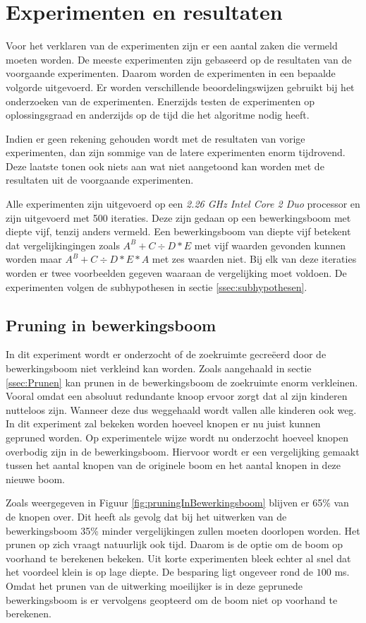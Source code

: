 \documentclass[Main.tex]{subfiles}
\begin{document}
\section{Experimenten en resultaten}
Voor het verklaren van de experimenten zijn er een aantal zaken die vermeld moeten worden. De meeste experimenten zijn gebaseerd op de resultaten van de voorgaande experimenten. Daarom worden de experimenten in een bepaalde volgorde uitgevoerd. Er worden verschillende beoordelingswijzen gebruikt bij het onderzoeken van de experimenten. Enerzijds testen de experimenten op oplossingsgraad en anderzijds op de tijd die het algoritme nodig heeft. 
\par Indien er geen rekening gehouden wordt met de resultaten van vorige experimenten, dan zijn sommige van de latere experimenten enorm tijdrovend. Deze laatste tonen ook niets aan wat niet aangetoond kan worden met de resultaten uit de voorgaande experimenten. \par Alle experimenten zijn uitgevoerd op een \textit{2.26 GHz Intel Core 2 Duo} processor en zijn uitgevoerd met 500 iteraties. Deze zijn gedaan op een bewerkingsboom met diepte vijf, tenzij anders vermeld. Een bewerkingsboom van diepte vijf betekent dat vergelijkingingen zoals $A^{B}+C \div D \ast E$ met vijf waarden gevonden kunnen worden maar $A^{B}+C \div D \ast E \ast A$ met zes waarden niet. Bij elk van deze iteraties worden er twee voorbeelden gegeven waaraan de vergelijking moet voldoen. De experimenten volgen de subhypothesen in sectie \ref{ssec:subhypothesen}.  

\subsection{Pruning in bewerkingsboom} \label{ssec:pruning}
In dit experiment wordt er onderzocht of de zoekruimte gecre\"eerd door de bewerkingsboom niet verkleind kan worden. Zoals aangehaald in sectie \ref{ssec:Prunen} kan prunen in de bewerkingsboom de zoekruimte enorm verkleinen. Vooral omdat een absoluut redundante knoop ervoor zorgt dat al zijn kinderen nutteloos zijn. Wanneer deze dus weggehaald wordt vallen alle kinderen ook weg. In dit experiment zal bekeken worden hoeveel knopen er nu juist kunnen gepruned worden. Op experimentele wijze wordt nu onderzocht hoeveel knopen overbodig zijn in de bewerkingsboom. Hiervoor wordt er een vergelijking gemaakt tussen het aantal knopen van de originele boom en het aantal knopen in deze nieuwe boom.
\par Zoals weergegeven in Figuur \ref{fig:pruningInBewerkingsboom} blijven er 65\% van de knopen over. Dit heeft als gevolg dat bij het uitwerken van de bewerkingsboom 35\% minder vergelijkingen zullen moeten doorlopen worden. Het prunen op zich vraagt natuurlijk ook tijd. Daarom is de optie om de boom op voorhand te berekenen bekeken. Uit korte experimenten bleek echter al snel dat het voordeel klein is op lage diepte. De besparing ligt ongeveer rond de $100$ ms. Omdat het prunen van de uitwerking moeilijker is in deze geprunede bewerkingsboom is er vervolgens geopteerd om de boom niet op voorhand te berekenen.
\end{document}
